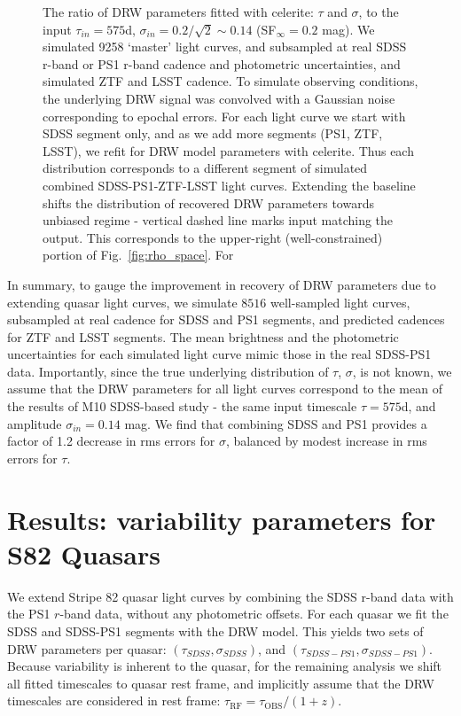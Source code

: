 \documentclass[twocolumn]{aastex62}
\newcommand{\project}[1]{\textsf{#1}}
\begin{document}
\begin{figure*} 
	\caption{The ratio of DRW parameters fitted with \project{celerite}: $\tau$ and $\sigma$, to the input $\tau_{in} = 575 $d, $\sigma_{in} = 0.2 / \sqrt{2} {\sim} 0.14$  (SF$_{\infty}=0.2$ mag). We simulated 9258 `master' light curves, and  subsampled at real SDSS r-band or PS1 r-band cadence and photometric uncertainties, and simulated ZTF and LSST cadence. To simulate observing conditions, the underlying DRW signal was convolved with a Gaussian noise corresponding to epochal errors. 
	For each light curve we start with SDSS segment only, and as we add more segments (PS1, ZTF, LSST), we refit for DRW model parameters with \project{celerite}. Thus
	each distribution corresponds to a different segment of simulated  combined SDSS-PS1-ZTF-LSST light curves. Extending the baseline shifts the distribution of recovered DRW parameters towards unbiased regime - vertical dashed line marks input matching the output. This corresponds to the upper-right (well-constrained) portion of Fig.~\ref{fig:rho_space}. For }
	\label{fig:lc_simulated_results}
\end{figure*} 

In summary, to gauge the improvement in recovery of DRW parameters due to extending quasar light curves, we simulate $8516$ well-sampled light curves, subsampled at real cadence for SDSS and PS1 segments, and predicted cadences for ZTF and LSST segments. The mean brightness and the photometric uncertainties for each simulated light curve  mimic those in the real SDSS-PS1 data. Importantly, since the true underlying distribution of $\tau$, $\sigma$, is not known, we assume that the DRW parameters for all light curves correspond to the mean of the results of M10 SDSS-based study - the same input timescale $\tau=575$d, and amplitude $\sigma_{in}=0.14$ mag.  We find that combining SDSS and PS1 provides a factor of 1.2 decrease in rms errors for $\sigma$, balanced by modest increase in rms errors for $\tau$.
%
%
%
%
%
%

\section{Results: variability parameters for S82 Quasars}\label{sec:results}

We extend Stripe 82 quasar light curves by combining the SDSS r-band data with  the PS1 $r$-band data, without any photometric offsets. For each quasar we fit the SDSS and SDSS-PS1 segments  with the DRW model. This yields two sets of DRW parameters per quasar: $(\tau_{SDSS}, \sigma_{SDSS})$, and $(\tau_{SDSS-PS1},\sigma_{SDSS-PS1})$. Because variability is inherent to the quasar, for the remaining analysis we shift all fitted timescales to quasar rest frame, and implicitly assume that the DRW timescales are considered in rest frame: $\tau_{\mathrm{RF}} = \tau_{\mathrm{OBS}} / (1+z)$.
\end{document}
